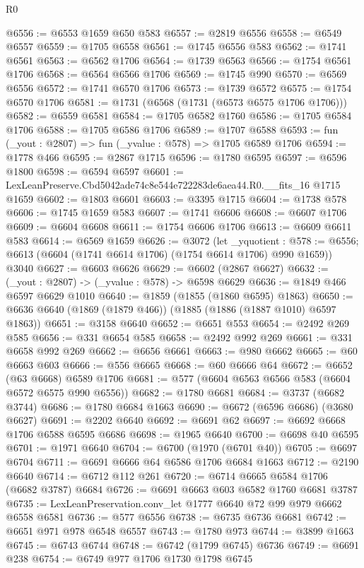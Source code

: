 \begin{lexlean}{R0}
\begin{coremodule}
@6556 := @6553 @1659 @650 @583
@6557 := @2819 @6556
@6558 := @6549 @6557
@6559 := @1705 @6558
@6561 := @1745 @6556 @583
@6562 := @1741 @6561
@6563 := @6562 @1706
@6564 := @1739 @6563
@6566 := @1754 @6561 @1706
@6568 := @6564 @6566 @1706
@6569 := @1745 @990
@6570 := @6569 @6556
@6572 := @1741 @6570 @1706
@6573 := @1739 @6572
@6575 := @1754 @6570 @1706
@6581 := @1731 (@6568 (@1731 (@6573 @6575 @1706 @1706)))
@6582 := @6559 @6581
@6584 := @1705 @6582 @1760
@6586 := @1705 @6584 @1706
@6588 := @1705 @6586 @1706
@6589 := @1707 @6588
@6593 := fun (_yout : @2807) => fun (_yvalue : @578) => @1705 @6589 @1706
@6594 := @1778 @466
@6595 := @2867 @1715
@6596 := @1780 @6595
@6597 := @6596 @1800
@6598 := @6594 @6597
@6601 := LexLeanPreserve.Cbd5042ade74c8e544e722283de6aea44.R0.__fits_16 @1715 @1659
@6602 := @1803 @6601
@6603 := @3395 @1715
@6604 := @1738 @578
@6606 := @1745 @1659 @583
@6607 := @1741 @6606
@6608 := @6607 @1706
@6609 := @6604 @6608
@6611 := @1754 @6606 @1706
@6613 := @6609 @6611 @583
@6614 := @6569 @1659
@6626 := @3072
    (let _yquotient : @578 := @6556;
    @6613 (@6604 (@1741 @6614 @1706) (@1754 @6614 @1706) @990 @1659))
    @3040
@6627 := @6603 @6626
@6629 := @6602 (@2867 @6627)
@6632 := (_yout : @2807) -> (_yvalue : @578) -> @6598 @6629
@6636 := @1849 @466 @6597 @6629 @1010
@6640 := @1859 (@1855 (@1860 @6595) @1863)
@6650 := @6636 @6640 (@1869 (@1879 @466)) (@1885 (@1886 (@1887 @1010) @6597 @1863))
@6651 := @3158 @6640
@6652 := @6651 @553
@6654 := @2492 @269 @585
@6656 := @331 @6654 @585
@6658 := @2492 @992 @269
@6661 := @331 @6658 @992 @269
@6662 := @6656 @6661
@6663 := @980 @6662
@6665 := @60 @6663 @603
@6666 := @556 @6665
@6668 := @60 @6666 @64
@6672 := @6652 (@63 @6668) @6589 @1706
@6681 := @577 (@6604 @6563 @6566 @583 (@6604 @6572 @6575 @990 @6556))
@6682 := @1780 @6681
@6684 := @3737 (@6682 @3744)
@6686 := @1780 @6684 @1663
@6690 := @6672 (@6596 @6686) (@3680 @6627)
@6691 := @2202 @6640
@6692 := @6691 @62
@6697 := @6692 @6668 @1706 @6588 @6595 @6686
@6698 := @1965 @6640
@6700 := @6698 @40 @6595
@6701 := @1971 @6640
@6704 := @6700 (@1970 (@6701 @40))
@6705 := @6697 @6704
@6711 := @6691 @6666 @64 @6586 @1706 @6684 @1663
@6712 := @2190 @6640
@6714 := @6712 @112 @261
@6720 := @6714 @6665 @6584 @1706 (@6682 @3787) @6684
@6726 := @6691 @6663 @603 @6582 @1760 @6681 @3787
@6735 := LexLeanPreservation.conv_let @1777 @6640 @72 @99 @979 @6662 @6558 @6581
@6736 := @577 @6556
@6738 := @6735 @6736 @6681
@6742 := @6651 @971 @978 @6548 @6557
@6743 := @1780 @973
@6744 := @3899 @1663
@6745 := @6743 @6744
@6748 := @6742 (@1799 @6745) @6736
@6749 := @6691 @238
@6754 := @6749 @977 @1706 @1730 @1798 @6745

\end{coremodule}
\end{lexlean}
